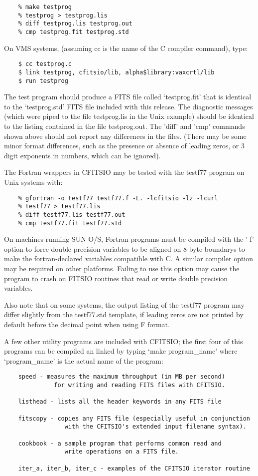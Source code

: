 \documentclass[11pt]{book}
\begin{document}
\begin{verbatim}
    % make testprog
    % testprog > testprog.lis
    % diff testprog.lis testprog.out
    % cmp testprog.fit testprog.std
\end{verbatim}
 On VMS systems,
(assuming cc is the name of the C compiler command), type:

\begin{verbatim}
    $ cc testprog.c
    $ link testprog, cfitsio/lib, alpha$library:vaxcrtl/lib
    $ run testprog
\end{verbatim}
The test program should produce a FITS file called `testprog.fit'
that is identical to the `testprog.std' FITS file included with this
release.  The diagnostic messages (which were piped to the file
testprog.lis in the Unix example) should be identical to the listing
contained in the file testprog.out.  The 'diff' and 'cmp' commands
shown above should not report any differences in the files.  (There
may be some minor format differences, such as the presence or
absence of leading zeros, or 3 digit exponents in numbers,
which can be ignored).

The Fortran wrappers in CFITSIO may be tested with the testf77
program on Unix systems with:

\begin{verbatim}
    % gfortran -o testf77 testf77.f -L. -lcfitsio -lz -lcurl
    % testf77 > testf77.lis
    % diff testf77.lis testf77.out
    % cmp testf77.fit testf77.std
\end{verbatim}
On machines running SUN O/S, Fortran programs must be compiled with the
'-f' option to force double precision variables to be aligned on 8-byte
boundarys to make the fortran-declared variables compatible with C.  A
similar compiler option may be required on other platforms.  Failing to
use this option may cause the program to crash on FITSIO routines that
read or write double precision variables.

Also note that on some systems, the output listing of the testf77
program may differ slightly from the testf77.std template, if leading
zeros are not printed by default before the decimal point when using F
format.

A few other utility programs are included with CFITSIO; the first four
of this programs can be compiled an linked by typing `make
program\_name' where `program\_name' is the actual name of the program:

\begin{verbatim}
    speed - measures the maximum throughput (in MB per second)
              for writing and reading FITS files with CFITSIO.

    listhead - lists all the header keywords in any FITS file

    fitscopy - copies any FITS file (especially useful in conjunction
                 with the CFITSIO's extended input filename syntax).

    cookbook - a sample program that performs common read and
                 write operations on a FITS file.

    iter_a, iter_b, iter_c - examples of the CFITSIO iterator routine
\end{verbatim}
\end{document}
